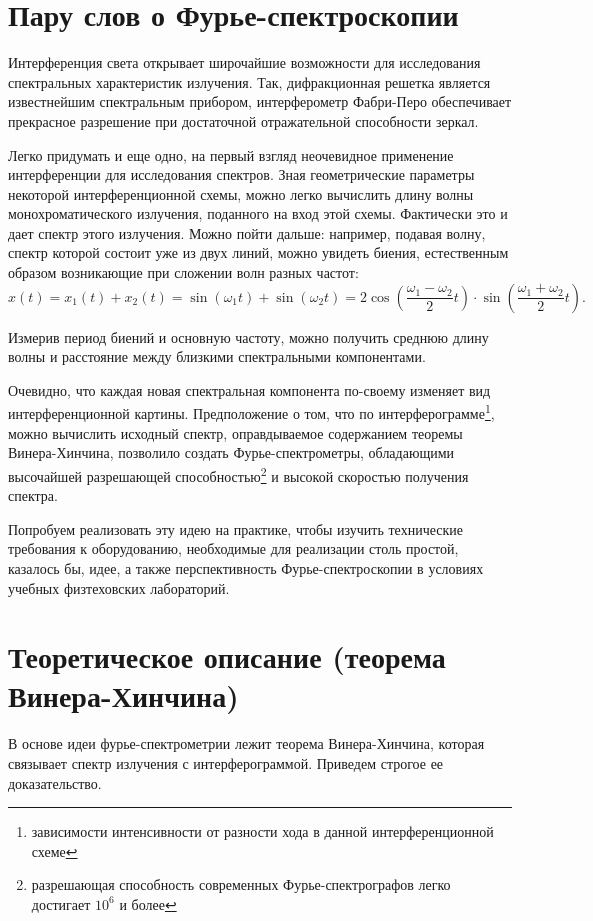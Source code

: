 \documentclass{urticle}
\begin{document}



\section*{Пару слов о Фурье-спектроскопии}
Интерференция света открывает широчайшие возможности для исследования спектральных характеристик излучения. Так, дифракционная решетка является известнейшим спектральным прибором, интерферометр Фабри-Перо обеспечивает прекрасное разрешение при достаточной отражательной способности зеркал.

Легко придумать и еще одно, на первый взгляд неочевидное применение интерференции для исследования спектров. Зная геометрические параметры некоторой интерференционной схемы, можно легко вычислить длину волны монохроматического излучения, поданного на вход этой схемы. Фактически это и дает спектр этого излучения. Можно пойти дальше: например, подавая волну, спектр которой состоит уже из двух линий, можно увидеть биения, естественным образом возникающие при сложении волн разных частот:
$$x(t) = x_1(t) + x_2(t) = \sin(\omega_1 t) + \sin(\omega_2 t) =
2\cos\left(\frac{\omega_1-\omega_2}{2}t\right)\cdot\sin\left(\frac{\omega_1+\omega_2}{2}t\right).$$

Измерив период биений и основную частоту, можно получить среднюю длину волны и расстояние между близкими спектральными компонентами.

Очевидно, что каждая новая спектральная компонента по-своему изменяет вид интерференционной картины. Предположение о том, что по интерферограмме\footnote{зависимости интенсивности от разности хода в данной интерференционной схеме}, можно вычислить исходный спектр, оправдываемое содержанием теоремы Винера-Хинчина, позволило создать Фурье-спектрометры, обладающими высочайшей разрешающей способностью\footnote{разрешающая способность современных Фурье-спектрографов легко достигает $10^6$ и более} и высокой скоростью получения спектра.

Попробуем реализовать эту идею на практике, чтобы изучить технические требования к оборудованию, необходимые для реализации столь простой, казалось бы, идее, а также перспективность Фурье-спектроскопии в условиях учебных физтеховских лабораторий.

\newpage
\section*{Теоретическое описание (теорема Винера-Хинчина)}
В основе идеи фурье-спектрометрии лежит теорема Винера-Хинчина, которая связывает спектр излучения с интерферограммой. Приведем строгое ее доказательство.
\end{document}
